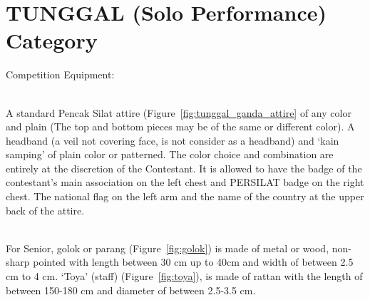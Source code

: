 \section{TUNGGAL (Solo Performance) Category}
\label{sec:tunggal_category}


\begin{legal}
\item Competition Equipment:
    \begin{legal}
    \item {}\\

    A standard Pencak Silat attire (Figure~\ref{fig:tunggal_ganda_attire} of any color and plain (The top and bottom pieces may be of the same or different color). A headband (a veil not covering face, is not consider as a headband) and ‘kain samping’ of plain color or patterned. The color choice and combination are entirely at the discretion of the Contestant. It is allowed to have the badge of the contestant’s main association on the left chest and PERSILAT badge on the right chest. The national flag on the left arm and the name of the country at the upper back of the attire.

    
    \item {}\\
    For Senior, golok or parang (Figure~\ref{fig:golok}) is made of metal or wood, non-sharp pointed with length 
    between 30 cm up to 40cm and width of between 2.5 cm to 4 cm.  `Toya' (staff) (Figure~\ref{fig:toya}), 
    is made of rattan with the length of between 150-180 cm and diameter of between 2.5-3.5 cm.


\end{legal}
\end{legal}
